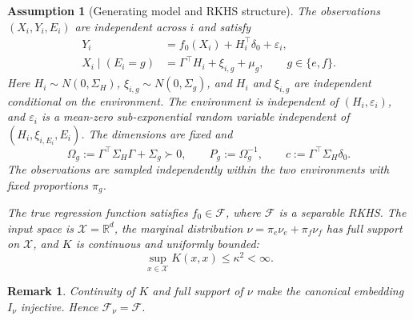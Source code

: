 \documentclass[11pt]{article}
\newtheorem{remark}{Remark}[section]
\newtheorem{assumption}{Assumption}
\newcommand{\R}{\mathbb{R}}
\newcommand{\F}{\mathcal{F}}
\newcommand{\X}{\mathcal{X}}
\newcommand{\eps}{\varepsilon}
\newcommand{\ran}{\operatorname{ran}}
\begin{document}
\begin{assumption}[Generating model and RKHS structure]\label{assump:model}
The observations $(X_i,Y_i,E_i)$ are independent across $i$ and satisfy
\begin{align}
 Y_i&=f_0(X_i)+H_i^\top\delta_0+\eps_i,\label{eq:model}\\
 X_i\mid(E_i=g)&=\Gamma^\top H_i+\xi_{i,g}+\mu_g,\qquad g\in\{e,f\}.
 \label{eq:confounding_covariates}
\end{align}
Here $H_i\sim N(0,\Sigma_H)$, $\xi_{i,g}\sim N(0,\Sigma_g)$, and $H_i$ and $\xi_{i,g}$ are independent conditional on the environment. The environment is independent of $(H_i,\eps_i)$, and $\eps_i$ is a mean-zero sub-exponential random variable independent of $(H_i,\xi_{i,E_i},E_i)$. The dimensions are fixed and
\[
 \Omega_g:=\Gamma^\top\Sigma_H\Gamma+\Sigma_g\succ0,
 \qquad P_g:=\Omega_g^{-1},\qquad c:=\Gamma^\top\Sigma_H\delta_0.
\]
The observations are sampled independently within the two environments with fixed proportions $\pi_g$.


The true regression function satisfies $f_0\in\F$, where $\F$ is a separable RKHS. The input space is $\X=\R^d$, the marginal distribution $\nu=\pi_e\nu_e+\pi_f\nu_f$ has full support on $\X$, and $K$ is continuous and uniformly bounded:
\begin{equation}
 \sup_{x\in\X}K(x,x)\leq\kappa^2<\infty.
 \label{eq:bounded_kernel}
\end{equation}

\end{assumption}

\begin{remark}
Continuity of $K$ and full support of $\nu$ make the canonical embedding $I_\nu$ injective. Hence $\F_\nu=\F$.
\end{remark}
\end{document}
